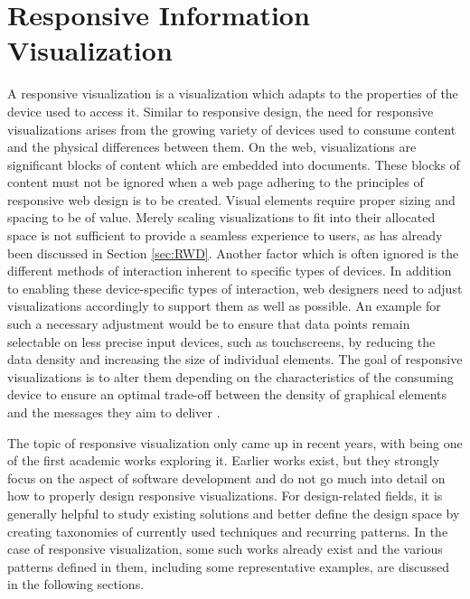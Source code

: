 \chapter{Responsive Information Visualization}

A responsive visualization is a visualization which adapts to the properties of the device used to access it.
Similar to responsive design, the need for responsive visualizations arises from the growing variety of devices used to consume content and the physical differences between them.
On the web, visualizations are significant blocks of content which are embedded into documents.
These blocks of content must not be ignored when a web page adhering to the principles of responsive web design is to be created.
Visual elements require proper sizing and spacing to be of value.
Merely scaling visualizations to fit into their allocated space is not sufficient to provide a seamless experience to users, as has already been discussed in Section \ref{sec:RWD}.
Another factor which is often ignored is the different methods of interaction inherent to specific types of devices.
In addition to enabling these device-specific types of interaction, web designers need to adjust visualizations accordingly to support them as well as possible.
An example for such a necessary adjustment would be to ensure that data points remain selectable on less precise input devices, such as touchscreens, by reducing the data density and increasing the size of individual elements.
The goal of responsive visualizations is to alter them depending on the characteristics of the consuming device to ensure an optimal trade-off between the density of graphical elements and the messages they aim to deliver \parencite{DesignPatternsTradeOffsRespVis}. 

The topic of responsive visualization only came up in recent years, with \cite{RespVis} being one of the first academic works exploring it.
Earlier works \parencite{BuildingRespDataVisForTheWeb,LearningRespDataVis} exist, but they strongly focus on the aspect of software development and do not go much into detail on how to properly design responsive visualizations.
 For design-related fields, it is generally helpful to study existing solutions and better define the design space by creating taxonomies of currently used techniques and recurring patterns.
In the case of responsive visualization, some such works already exist \parencite{TechniquesForFlexibleRespVisDesign,DesignPatternsTradeOffsRespVis,RespVisSurvey} and the various patterns defined in them, including some representative examples, are discussed in the following sections.

